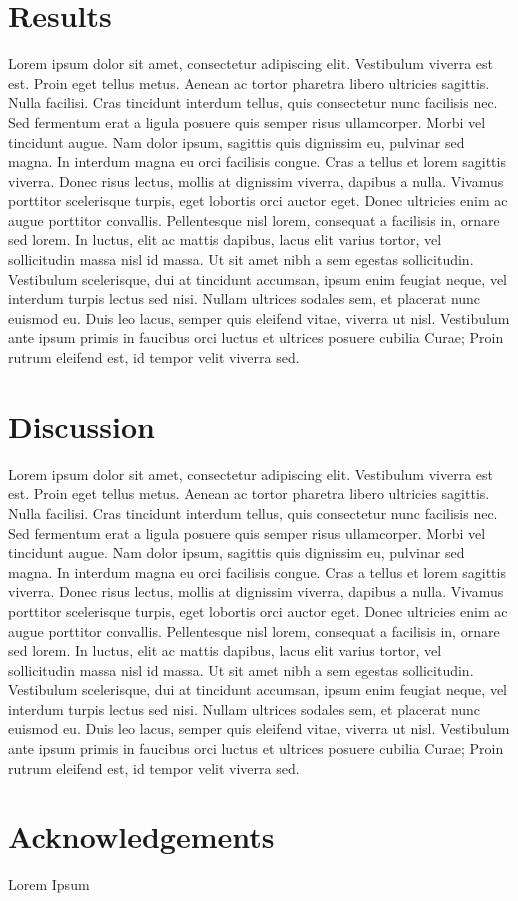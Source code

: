 \documentclass[graybox,natbib]{svmult}
\begin{document}
\section{Results}\label{results}

Lorem ipsum dolor sit amet, consectetur adipiscing elit. Vestibulum
viverra est est. Proin eget tellus metus. Aenean ac tortor pharetra
libero ultricies sagittis. Nulla facilisi. Cras tincidunt interdum
tellus, quis consectetur nunc facilisis nec. Sed fermentum erat a ligula
posuere quis semper risus ullamcorper. Morbi vel tincidunt augue. Nam
dolor ipsum, sagittis quis dignissim eu, pulvinar sed magna. In interdum
magna eu orci facilisis congue. Cras a tellus et lorem sagittis viverra.
Donec risus lectus, mollis at dignissim viverra, dapibus a nulla.
Vivamus porttitor scelerisque turpis, eget lobortis orci auctor eget.
Donec ultricies enim ac augue porttitor convallis. Pellentesque nisl
lorem, consequat a facilisis in, ornare sed lorem. In luctus, elit ac
mattis dapibus, lacus elit varius tortor, vel sollicitudin massa nisl id
massa. Ut sit amet nibh a sem egestas sollicitudin. Vestibulum
scelerisque, dui at tincidunt accumsan, ipsum enim feugiat neque, vel
interdum turpis lectus sed nisi. Nullam ultrices sodales sem, et
placerat nunc euismod eu. Duis leo lacus, semper quis eleifend vitae,
viverra ut nisl. Vestibulum ante ipsum primis in faucibus orci luctus et
ultrices posuere cubilia Curae; Proin rutrum eleifend est, id tempor
velit viverra sed.

\section{Discussion}\label{discussion}

Lorem ipsum dolor sit amet, consectetur adipiscing elit. Vestibulum
viverra est est. Proin eget tellus metus. Aenean ac tortor pharetra
libero ultricies sagittis. Nulla facilisi. Cras tincidunt interdum
tellus, quis consectetur nunc facilisis nec. Sed fermentum erat a ligula
posuere quis semper risus ullamcorper. Morbi vel tincidunt augue. Nam
dolor ipsum, sagittis quis dignissim eu, pulvinar sed magna. In interdum
magna eu orci facilisis congue. Cras a tellus et lorem sagittis viverra.
Donec risus lectus, mollis at dignissim viverra, dapibus a nulla.
Vivamus porttitor scelerisque turpis, eget lobortis orci auctor eget.
Donec ultricies enim ac augue porttitor convallis. Pellentesque nisl
lorem, consequat a facilisis in, ornare sed lorem. In luctus, elit ac
mattis dapibus, lacus elit varius tortor, vel sollicitudin massa nisl id
massa. Ut sit amet nibh a sem egestas sollicitudin. Vestibulum
scelerisque, dui at tincidunt accumsan, ipsum enim feugiat neque, vel
interdum turpis lectus sed nisi. Nullam ultrices sodales sem, et
placerat nunc euismod eu. Duis leo lacus, semper quis eleifend vitae,
viverra ut nisl. Vestibulum ante ipsum primis in faucibus orci luctus et
ultrices posuere cubilia Curae; Proin rutrum eleifend est, id tempor
velit viverra sed.

\section{Acknowledgements}\label{acknowledgements}

Lorem Ipsum





\end{document}
